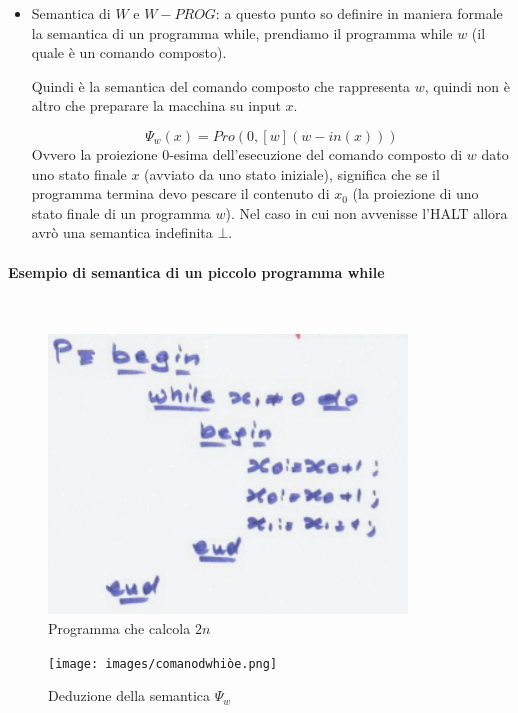 \documentclass{article}
\begin{document}
\begin{itemize}
    \item Semantica di $W$ e $W-PROG$: a questo punto so definire in maniera formale la semantica
          di un programma while, prendiamo il programma while $w$ (il quale è un comando composto).

          Quindi è la semantica del comando composto che rappresenta $w$, quindi non è altro che preparare
          la macchina su input $x$.

          $$\Psi_w(x)=Pro(0,[w](w-in(x)))$$
          Ovvero la proiezione 0-esima dell'esecuzione del comando composto di $w$ dato uno stato finale $x$ (avviato
          da uno stato iniziale),
          significa che se il programma termina devo pescare il contenuto di $x_0$ (la proiezione di uno stato finale
          di un programma $w$).
          Nel caso in cui non avvenisse l'HALT allora avrò una semantica indefinita $\bot$.
\end{itemize}

\paragraph{Esempio di semantica di un piccolo programma while}\mbox{}\\
\begin{figure}[H]
    \centering
    \includegraphics[scale=0.7]{images/smallprog.png}
    \caption{Programma che calcola $2n$}
\end{figure}

\begin{figure}[H]
    \centering
    \texttt{[image: images/comanodwhiòe.png]}
    \caption{Deduzione della semantica $\Psi_w$}
\end{figure}
\end{document}
